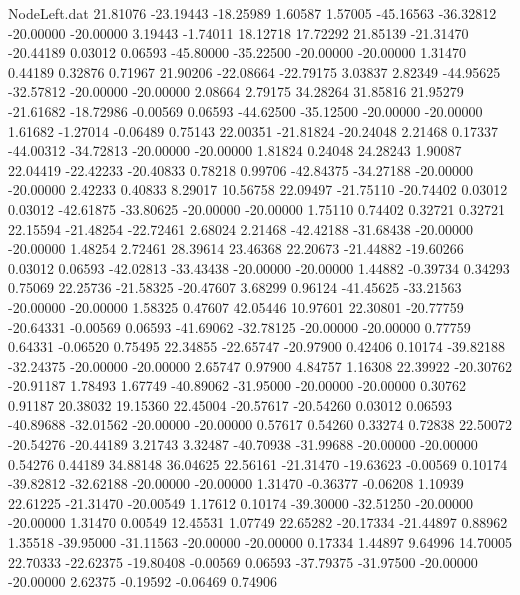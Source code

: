 \begin{filecontents}{NodeLeft.dat}
  21.81076  -23.19443  -18.25989     1.60587    1.57005  -45.16563  -36.32812  -20.00000  -20.00000    3.19443   -1.74011   18.12718   17.72292
  21.85139  -21.31470  -20.44189     0.03012    0.06593  -45.80000  -35.22500  -20.00000  -20.00000    1.31470    0.44189    0.32876    0.71967
  21.90206  -22.08664  -22.79175     3.03837    2.82349  -44.95625  -32.57812  -20.00000  -20.00000    2.08664    2.79175   34.28264   31.85816
  21.95279  -21.61682  -18.72986    -0.00569    0.06593  -44.62500  -35.12500  -20.00000  -20.00000    1.61682   -1.27014   -0.06489    0.75143
  22.00351  -21.81824  -20.24048     2.21468    0.17337  -44.00312  -34.72813  -20.00000  -20.00000    1.81824    0.24048   24.28243    1.90087
  22.04419  -22.42233  -20.40833     0.78218    0.99706  -42.84375  -34.27188  -20.00000  -20.00000    2.42233    0.40833    8.29017   10.56758
  22.09497  -21.75110  -20.74402     0.03012    0.03012  -42.61875  -33.80625  -20.00000  -20.00000    1.75110    0.74402    0.32721    0.32721
  22.15594  -21.48254  -22.72461     2.68024    2.21468  -42.42188  -31.68438  -20.00000  -20.00000    1.48254    2.72461   28.39614   23.46368
  22.20673  -21.44882  -19.60266     0.03012    0.06593  -42.02813  -33.43438  -20.00000  -20.00000    1.44882   -0.39734    0.34293    0.75069
  22.25736  -21.58325  -20.47607     3.68299    0.96124  -41.45625  -33.21563  -20.00000  -20.00000    1.58325    0.47607   42.05446   10.97601
  22.30801  -20.77759  -20.64331    -0.00569    0.06593  -41.69062  -32.78125  -20.00000  -20.00000    0.77759    0.64331   -0.06520    0.75495
  22.34855  -22.65747  -20.97900     0.42406    0.10174  -39.82188  -32.24375  -20.00000  -20.00000    2.65747    0.97900    4.84757    1.16308
  22.39922  -20.30762  -20.91187     1.78493    1.67749  -40.89062  -31.95000  -20.00000  -20.00000    0.30762    0.91187   20.38032   19.15360
  22.45004  -20.57617  -20.54260     0.03012    0.06593  -40.89688  -32.01562  -20.00000  -20.00000    0.57617    0.54260    0.33274    0.72838
  22.50072  -20.54276  -20.44189     3.21743    3.32487  -40.70938  -31.99688  -20.00000  -20.00000    0.54276    0.44189   34.88148   36.04625
  22.56161  -21.31470  -19.63623    -0.00569    0.10174  -39.82812  -32.62188  -20.00000  -20.00000    1.31470   -0.36377   -0.06208    1.10939
  22.61225  -21.31470  -20.00549     1.17612    0.10174  -39.30000  -32.51250  -20.00000  -20.00000    1.31470    0.00549   12.45531    1.07749
  22.65282  -20.17334  -21.44897     0.88962    1.35518  -39.95000  -31.11563  -20.00000  -20.00000    0.17334    1.44897    9.64996   14.70005
  22.70333  -22.62375  -19.80408    -0.00569    0.06593  -37.79375  -31.97500  -20.00000  -20.00000    2.62375   -0.19592   -0.06469    0.74906

\end{filecontents}
